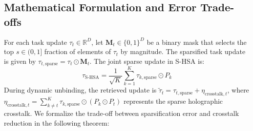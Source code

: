 \documentclass{article}
\theoremstyle{plain}
\theoremstyle{definition}
\theoremstyle{remark}
\begin{document}
\subsection{Mathematical Formulation and Error Trade-offs}
For each task update $\tau_t \in \mathbb{R}^D$, let $\mathbf{M}_t \in \{0, 1\}^D$ be a binary mask that selects the top $s \in (0, 1]$ fraction of elements of $\tau_t$ by magnitude. The sparsified task update is given by $\tau_{t, \text{sparse}} = \tau_t \odot \mathbf{M}_t$. The joint sparse update in S-HSA is:
\begin{equation}
    \tau_{\text{S-HSA}} = \frac{1}{\sqrt{K}} \sum_{k=1}^K \tau_{k, \text{sparse}} \odot P_k
\end{equation}
During dynamic unbinding, the retrieved update is $\tilde{\tau}_t = \tau_{t, \text{sparse}} + \eta_{\text{crosstalk}, t}$, where $\eta_{\text{crosstalk}, t} = \sum_{k \neq t}^K \tau_{k, \text{sparse}} \odot (P_k \odot P_t)$ represents the sparse holographic crosstalk. We formalize the trade-off between sparsification error and crosstalk reduction in the following theorem:
\end{document}
